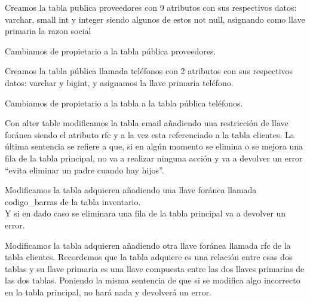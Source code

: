 \documentclass[letterpaper,12pt]{article}
\begin{document}
	
	
	Creamos la tabla publica proveedores con 9 atributos con sus respectivos datos: varchar, small int y integer siendo algunos de estos not null, asignando como llave primaria la razon social
	
	
	
	Cambiamos de propietario a la tabla pública proveedores.
	
	
	
	Creamos la tabla pública llamada teléfonos con 2 atributos con sus respectivos datos: varchar y bigint, y asignamos la llave primaria teléfono.
	
	
	
	Cambiamos de propietario a la tabla a la tabla pública teléfonos.
	
	
	
	Con alter table modificamos la tabla email añadiendo una restricción de llave foránea siendo el atributo rfc y a la vez esta referenciado a la tabla clientes.
	La última sentencia se refiere a que, si en algún momento se elimina o se mejora una fila de la tabla principal, no va a realizar ninguna acción y va a devolver un error “evita eliminar un padre cuando hay hijos”.
	
	
	
	Modificamos la tabla adquieren añadiendo una llave foránea llamada codigo\_barras de la tabla inventario. \\
	Y si en dado caso se eliminara una fila de la tabla principal va a devolver un error.
	
	
	
	Modificamos la tabla adquieren añadiendo otra llave foránea llamada rfc de la tabla clientes.
	Recordemos que la tabla adquiere es una relación entre esas dos tablas y su llave primaria es una llave compuesta entre las dos llaves primarias de las dos tablas.
	Poniendo la misma sentencia de que si se modifica algo incorrecto en la tabla principal, no hará nada y devolverá un error.
	
\end{document}
